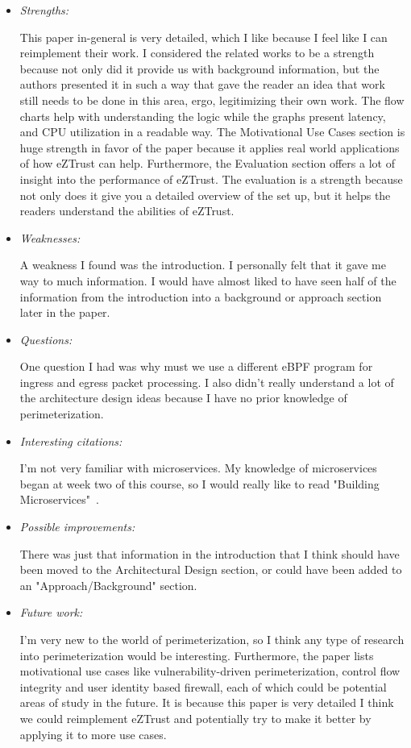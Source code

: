 \documentclass[letterpaper,twocolumn,10pt]{article}
\begin{document}
\begin{itemize}

\item {\it Strengths:} 

This paper in-general is very detailed, which I like because I feel like I can reimplement their work. I considered 
the related works to be a strength because not only did it provide us with background information, but the 
authors presented it in such a way that gave the reader an idea that work still needs to be done in this area,
ergo, legitimizing their own work. The flow charts help with understanding the logic while the graphs present latency,
and CPU utilization in a readable way. The Motivational Use Cases section is huge strength in favor of the paper
because it applies real world applications of how eZTrust can help. Furthermore, the Evaluation section offers 
a lot of insight into the performance of eZTrust. The evaluation is a strength because not only does it give you a 
detailed overview of the set up, but it helps the readers understand the abilities of eZTrust. 

\item {\it Weaknesses:} 

A weakness I found was the introduction. I personally felt that it gave me way to much information. 
I would have almost liked to have seen half of the information from the introduction into a background
or approach section later in the paper. 

\item {\it Questions:}

One question I had was why must we use a different eBPF program for ingress and egress packet
processing. I also didn't really understand a lot of the architecture design ideas because I have no 
prior knowledge of perimeterization. 

\item {\it Interesting citations:}

I'm not very familiar with microservices. My knowledge of microservices began at week two of this course, 
so I would really like to read "Building Microservices"~\cite{microservices}.

\item {\it Possible improvements:} 

There was just that information in the introduction that I think should have been moved to the Architectural Design
section, or could have been added to an "Approach/Background" section. 

\item {\it Future work:}

I'm very new to the world of perimeterization, so I think any type of research into perimeterization would be interesting. 
Furthermore, the paper lists motivational use cases like vulnerability-driven perimeterization, control flow
integrity and user identity based firewall, each of which could be potential areas of study in the future. 
It is because this paper is very detailed I think we could reimplement eZTrust and potentially try to make
it better by applying it to more use cases. 

\end{itemize}

{
  \small 
  
  
}
\end{document}
